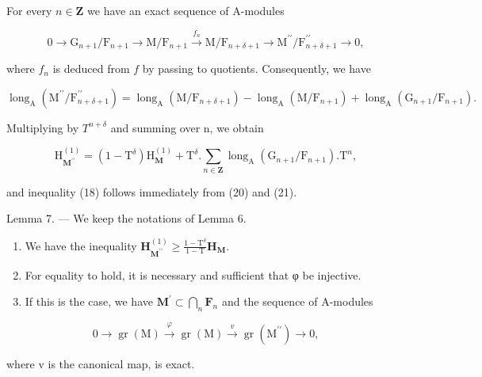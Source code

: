 For every \(n \in \mathbf{Z}\) we have an exact sequence of A-modules

\[
0 \longrightarrow \mathrm{G} _ {n + 1} / \mathrm{F} _ {n + 1} \longrightarrow \mathrm{M} / \mathrm{F} _ {n + 1} \xrightarrow {f _ {n}} \mathrm{M} / \mathrm{F} _ {n + \delta + 1} \longrightarrow \mathrm{M} ^ {\prime \prime} / \mathrm{F} _ {n + \delta + 1} ^ {\prime \prime} \longrightarrow 0,
\]

where \(f_{n}\) is deduced from \(f\) by passing to quotients. Consequently, we have

\[
\operatorname{long} _ {\mathrm{A}} \left(\mathrm{M} ^ {\prime \prime} / \mathrm{F} _ {n + \delta + 1} ^ {\prime \prime}\right) = \operatorname{long} _ {\mathrm{A}} \left(\mathrm{M} / \mathrm{F} _ {n + \delta + 1}\right) - \operatorname{long} _ {\mathrm{A}} \left(\mathrm{M} / \mathrm{F} _ {n + 1}\right) + \operatorname{long} _ {\mathrm{A}} \left(\mathrm{G} _ {n + 1} / \mathrm{F} _ {n + 1}\right).
\]

Multiplying by \(T^{n+\delta}\) and summing over n, we obtain

\[
\mathrm{H} _ {\mathbf {M} ^ {\prime \prime}} ^ {(1)} = (1 - \mathrm{T} ^ {\delta}) \mathrm{H} _ {\mathbf {M}} ^ {(1)} + \mathrm{T} ^ {\delta}. \sum_ {n \in \mathbf {Z}} \operatorname{long} _ {\mathrm{A}} (\mathrm{G} _ {n + 1} / \mathrm{F} _ {n + 1}). \mathrm{T} ^ {n},\tag{21}
\]

and inequality (18) follows immediately from (20) and (21).

Lemma 7. — We keep the notations of Lemma 6.

\begin{enumerate}
\def\labelenumi{\alph{enumi})}
\item
  We have the inequality \(\mathbf{H}_{\mathbf{M}^{\prime \prime}}^{(1)}\geqslant \frac{1 - \mathrm{T}^{\delta}}{1 - \mathrm{T}}\mathbf{H}_{\mathbf{M}}.\)
\item
  For equality to hold, it is necessary and sufficient that φ be injective.
\item
  If this is the case, we have \(\mathbf{M}^{\prime}\subset \bigcap_{n}\mathbf{F}_{n}\) and the sequence of A-modules
\end{enumerate}

\[
0 \longrightarrow \operatorname{gr} (\mathrm{M}) \stackrel {\varphi} {\longrightarrow} \operatorname{gr} (\mathrm{M}) \stackrel {v} {\longrightarrow} \operatorname{gr} (\mathrm{M} ^ {\prime \prime}) \longrightarrow 0,
\]

where v is the canonical map, is exact.

